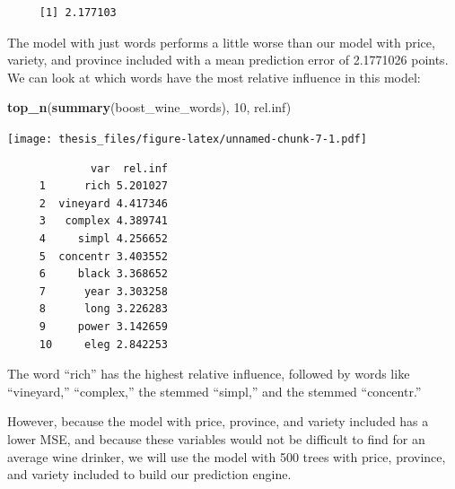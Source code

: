 \documentclass[12pt,twoside]{amherstthesis}
\newenvironment{Shaded}{\begin{snugshade}}{\end{snugshade}}
\newcommand{\KeywordTok}[1]{\textcolor[rgb]{0.13,0.29,0.53}{\textbf{#1}}}
\newcommand{\DataTypeTok}[1]{\textcolor[rgb]{0.13,0.29,0.53}{#1}}
\newcommand{\DecValTok}[1]{\textcolor[rgb]{0.00,0.00,0.81}{#1}}
\newcommand{\StringTok}[1]{\textcolor[rgb]{0.31,0.60,0.02}{#1}}
\newcommand{\CommentTok}[1]{\textcolor[rgb]{0.56,0.35,0.01}{\textit{#1}}}
\newcommand{\OtherTok}[1]{\textcolor[rgb]{0.56,0.35,0.01}{#1}}
\newcommand{\OperatorTok}[1]{\textcolor[rgb]{0.81,0.36,0.00}{\textbf{#1}}}
\newcommand{\NormalTok}[1]{#1}
\begin{document}
\begin{Shaded}
\end{Shaded}
\begin{verbatim}
     [1] 2.177103
\end{verbatim}
The model with just words performs a little worse than our model with
price, variety, and province included with a mean prediction error of
2.1771026 points. We can look at which words have the most relative
influence in this model:
\begin{Shaded}
\begin{Highlighting}[]
\KeywordTok{top_n}\NormalTok{(}\KeywordTok{summary}\NormalTok{(boost_wine_words), }\DecValTok{10}\NormalTok{, rel.inf)}
\end{Highlighting}
\end{Shaded}
\texttt{[image: thesis\_files/figure-latex/unnamed-chunk-7-1.pdf]}
\begin{verbatim}
             var  rel.inf
     1      rich 5.201027
     2  vineyard 4.417346
     3   complex 4.389741
     4     simpl 4.256652
     5  concentr 3.403552
     6     black 3.368652
     7      year 3.303258
     8      long 3.226283
     9     power 3.142659
     10     eleg 2.842253
\end{verbatim}
The word ``rich'' has the highest relative influence, followed by words
like ``vineyard,'' ``complex,'' the stemmed ``simpl,'' and the stemmed
``concentr.''

However, because the model with price, province, and variety included
has a lower MSE, and because these variables would not be difficult to
find for an average wine drinker, we will use the model with 500 trees
with price, province, and variety included to build our prediction
engine.
\end{document}
